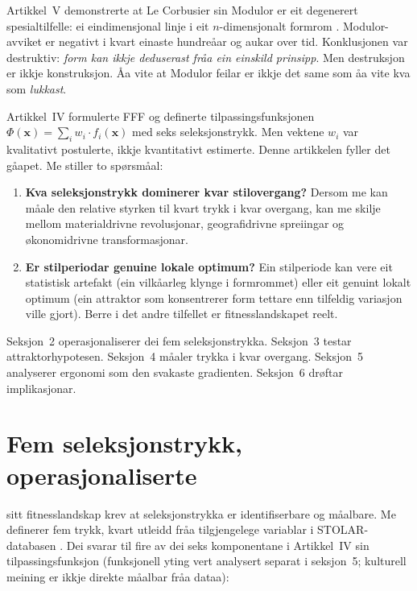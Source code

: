 \documentclass[10pt, a4paper, twocolumn]{article}
\begin{document}
Artikkel~V demonstrerte at Le Corbusier sin Modulor er eit degenerert spesialtilfelle: ei eindimensjonal linje i eit $n$-dimensjonalt formrom \citep{finne2026}. Modulor-avviket er negativt i kvart einaste hundre\r{a}ar og aukar over tid. Konklusjonen var destruktiv: \emph{form kan ikkje deduserast fr\r{a}a ein einskild prinsipp}. Men destruksjon er ikkje konstruksjon. \r{A}a vite at Modulor feilar er ikkje det same som \r{a}a vite kva som \emph{lukkast}.

Artikkel~IV formulerte FFF og definerte tilpassingsfunksjonen $\Phi(\mathbf{x}) = \sum_i w_i \cdot f_i(\mathbf{x})$ med seks seleksjonstrykk. Men vektene $w_i$ var kvalitativt postulerte, ikkje kvantitativt estimerte. Denne artikkelen fyller det g\r{a}apet. Me stiller to sp\o rsm\r{a}al:

\begin{enumerate}
  \item \textbf{Kva seleksjonstrykk dominerer kvar stilovergang?} Dersom me kan m\r{a}ale den relative styrken til kvart trykk i kvar overgang, kan me skilje mellom materialdrivne revolusjonar, geografidrivne spreiingar og \o konomidrivne transformasjonar.
  \item \textbf{Er stilperiodar genuine lokale optimum?} Ein stilperiode kan vere eit statistisk artefakt (ein vilk\r{a}arleg klynge i formrommet) eller eit genuint lokalt optimum (ein attraktor som konsentrerer form tettare enn tilfeldig variasjon ville gjort). Berre i det andre tilfellet er fitnesslandskapet reelt.
\end{enumerate}

Seksjon~2 operasjonaliserer dei fem seleksjonstrykka. Seksjon~3 testar attraktorhypotesen. Seksjon~4 m\r{a}aler trykka i kvar overgang. Seksjon~5 analyserer ergonomi som den svakaste gradienten. Seksjon~6 dr\o ftar implikasjonar.


\section{Fem seleksjonstrykk, operasjonaliserte}

\citet{kauffman1993} sitt fitnesslandskap krev at seleksjonstrykka er identifiserbare og m\r{a}albare. Me definerer fem trykk, kvart utleidd fr\r{a}a tilgjengelege variablar i STOLAR-databasen \citep{finne2026}. Dei svarar til fire av dei seks komponentane i Artikkel~IV sin tilpassingsfunksjon (funksjonell yting vert analysert separat i seksjon~5; kulturell meining er ikkje direkte m\r{a}albar fr\r{a}a dataa):
\end{document}
